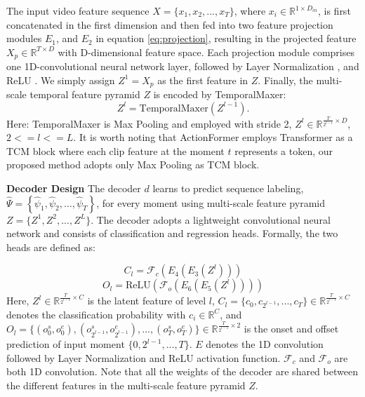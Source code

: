 \documentclass[10pt,twocolumn,letterpaper]{article}
\begin{document}
The input video feature sequence $X = \lbrace{x_1, x_2, . . . , x_T }\rbrace$, where $x_i \in \mathbb{R}^{1 \times D_{in}}$,  is first concatenated in the first dimension and then fed into two feature projection modules $E_1$, and $E_2$ in equation \ref{eq:projection}, resulting in the projected feature $X_{p} \in \mathbb{R}^{T \times D}$ with D-dimensional feature space. Each projection module comprises one 1D-convolutional neural network layer, followed by Layer Normalization \cite{ba2016layer}, and ReLU \cite{agarap2018deep}. We simply assign $Z^1 = X_p$ as the first feature in $Z$. Finally, the multi-scale temporal feature pyramid $Z$ is encoded by TemporalMaxer:
\begin{equation} \label{eq:zl}
    Z^l = \text{TemporalMaxer}(Z^{l-1}).
\end{equation}
Here: TemporalMaxer is Max Pooling and employed with stride 2, $Z^l \in \mathbb{R}^{\frac{T}{2^{l-1}} \times D}$, $2 <= l <= L$. It is worth noting that ActionFormer \cite{zhang2022actionformer} employs Transformer \cite{vaswani2017attention} as a TCM block where each clip feature at the moment $t$ represents a token, our proposed method adopts only Max Pooling \cite{boureau2010theoretical} as TCM block.

\textbf{Decoder Design}
The decoder $d$ learns to predict sequence labeling, $\hat{\Psi}=\left\{\hat{\psi}_1, \hat{\psi}_2, \ldots, \hat{\psi}_T\right\}$, for every moment using multi-scale feature pyramid $Z = \{Z^1, Z^2, . . . , Z^L\}$. The decoder adopts a lightweight convolutional neural network and consists of classification and regression heads. Formally, the two heads are defined as:

\begin{equation} \label{eq:cls}
    C_l = \mathcal{F}_c(E_4(E_3(Z^l)))
\end{equation}
\begin{equation} \label{eq:reg}
    O_l = \text{ReLU}(\mathcal{F}_o(E_6(E_5(Z^l))))
\end{equation}
Here, $Z^l \in \mathbb{R}^{\frac{T}{2^{l-1}} \times C}$ is the latent feature of level $l$, $C_l=\{c_0, c_{2^{l-1}},...,c_T\} \in \mathbb{R}^{\frac{T}{2^{l-1}} \times C}$ denotes the classification probability with $c_i \in \mathbb{R}^{C}$, and $O_l = \{(o_0^s, o_0^e), (o_{2^{l-1}}^s, o_{2^{l-1}}^e),...,(o_T^s, o_T^e)\} \in \mathbb{R}^{\frac{T}{2^{l-1}} \times 2}$ is the onset and offset prediction of input moment $\{0, 2^{l-1},..., T\}$. $E$ denotes the 1D convolution followed by Layer Normalization and ReLU activation function. $\mathcal{F}_c$ and $\mathcal{F}_o$ are both 1D convolution. Note that all the weights of the decoder are shared between the different features in the multi-scale feature pyramid $Z$.
\end{document}
